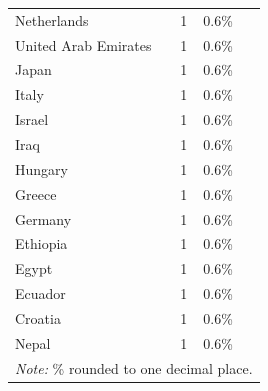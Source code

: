 \begin{table}[h]
\begin{tabular}{p{3cm} p{3cm} p{3cm} p{3cm}}
Netherlands & 1 & 0.6\% & \cite{Benoist_2019e} \\
United Arab Emirates & 1 & 0.6\% & \cite{Ali_2020f} \\
Japan & 1 & 0.6\% & \cite{Ohno_2005} \\
Italy & 1 & 0.6\% & \cite{Riva_2018j} \\
Israel & 1 & 0.6\% & \cite{Goldman_1998f} \\
Iraq & 1 & 0.6\% & \cite{Al-Faham_2020k} \\
Hungary & 1 & 0.6\% & \cite{Csaky_1998e} \\
Greece & 1 & 0.6\% & \cite{Sakellaridis_2008f} \\
Germany & 1 & 0.6\% & \cite{teWildt_2010} \\
Ethiopia & 1 & 0.6\% & \cite{Mesfin_2022a} \\
Egypt & 1 & 0.6\% & \cite{Ali_2022g} \\
Ecuador & 1 & 0.6\% & \cite{DelgadoSalazar_2020c} \\
Croatia & 1 & 0.6\% & \cite{Trgo_2012f} \\
Nepal & 1 & 0.6\% & \cite{Thapa_2019f} \\
\bottomrule
\bottomrule
\multicolumn{4}{l}{\footnotesize\textit{Note:} \% rounded to one decimal place.}

\end{tabular}
\end{table}
